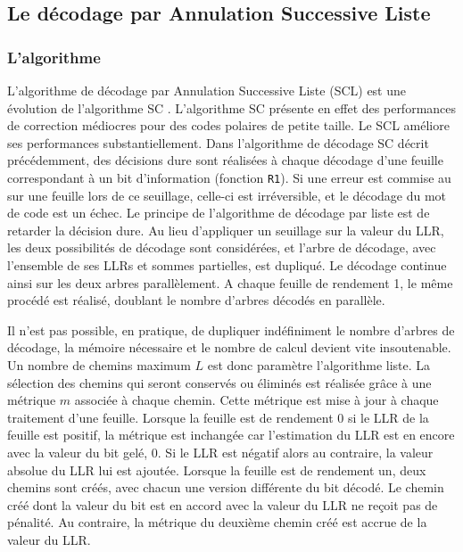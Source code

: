 \subsection{Le décodage par Annulation Successive Liste}
\subsubsection{L'algorithme}
L'algorithme de décodage par Annulation Successive Liste (SCL) est une évolution de l'algorithme SC \cite{tal_how_2013}. L'algorithme SC présente en effet des performances de correction médiocres pour des codes polaires de petite taille. Le SCL améliore ses performances substantiellement. Dans l'algorithme de décodage SC décrit précédemment, des décisions dure sont réalisées à chaque décodage d'une feuille correspondant à un bit d'information (fonction \texttt{R1}). Si une erreur est commise au sur une feuille lors de ce seuillage, celle-ci est irréversible, et le décodage du mot de code est un échec. Le principe de l'algorithme de décodage par liste est de retarder la décision dure. Au lieu d'appliquer un seuillage sur la valeur du LLR, les deux possibilités de décodage sont considérées, et l'arbre de décodage, avec l'ensemble de ses LLRs et sommes partielles, est dupliqué. Le décodage continue ainsi sur les deux arbres parallèlement. A chaque feuille de rendement 1, le même procédé est réalisé, doublant le nombre d'arbres décodés en parallèle.

Il n'est pas possible, en pratique, de dupliquer indéfiniment le nombre d'arbres de décodage, la mémoire nécessaire et le nombre de calcul devient vite insoutenable. Un nombre de chemins maximum $L$ est donc paramètre l'algorithme liste. La sélection des chemins qui seront conservés ou éliminés est réalisée grâce à une métrique $m$ associée à chaque chemin. Cette métrique est mise à jour à chaque traitement d'une feuille. Lorsque la feuille est de rendement 0 si le LLR de la feuille est positif, la métrique est inchangée car l'estimation du LLR est en encore avec la valeur du bit gelé, 0. Si le LLR est négatif alors au contraire, la valeur absolue du LLR lui est ajoutée. Lorsque la feuille est de rendement un, deux chemins sont créés, avec chacun une version différente du bit décodé. Le chemin créé dont la valeur du bit est en accord avec la valeur du LLR ne reçoit pas de pénalité. Au contraire, la métrique du deuxième chemin créé est accrue de la valeur du LLR.

